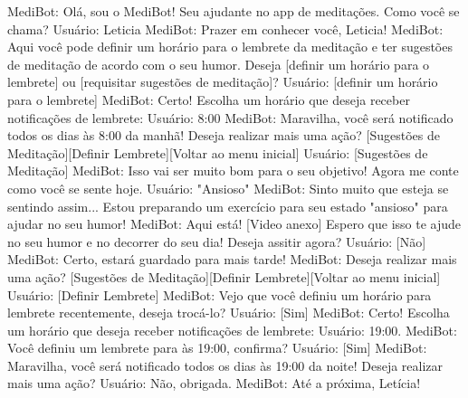 MediBot: Olá, sou o MediBot! Seu ajudante no app de meditações. Como você se chama?
Usuário: Leticia
MediBot: Prazer em conhecer você, Leticia!
MediBot: Aqui você pode definir um horário para o lembrete da meditação
        e ter sugestões de meditação de acordo com o seu humor. Deseja [definir um horário para o lembrete]
        ou [requisitar sugestões de meditação]?
Usuário: [definir um horário para o lembrete]
MediBot: Certo! Escolha um horário que deseja receber notificações de lembrete:
Usuário: 8:00
MediBot: Maravilha, você será notificado todos os dias às 8:00 da manhã! Deseja realizar mais uma ação? 
        [Sugestões de Meditação][Definir Lembrete][Voltar ao menu inicial]
Usuário: [Sugestões de Meditação]
MediBot: Isso vai ser muito bom para o seu objetivo! Agora me conte como você se sente hoje.
Usuário: "Ansioso"
MediBot: Sinto muito que esteja se sentindo assim... Estou preparando um exercício para seu estado "ansioso" para ajudar no seu humor! 
MediBot: Aqui está! [Video anexo] Espero que isso te ajude no seu humor e no decorrer do seu dia! Deseja assitir agora?
Usuário: [Não]
MediBot: Certo, estará guardado para mais tarde!
MediBot: Deseja realizar mais uma ação? 
        [Sugestões de Meditação][Definir Lembrete][Voltar ao menu inicial]
Usuário: [Definir Lembrete]
MediBot: Vejo que você definiu um horário para lembrete recentemente, deseja trocá-lo?
Usuário: [Sim]
MediBot: Certo! Escolha um horário que deseja receber notificações de lembrete:
Usuário: 19:00.
MediBot: Você definiu um lembrete para às 19:00, confirma?
Usuário: [Sim]
MediBot: Maravilha, você será notificado todos os dias às 19:00 da noite! Deseja realizar mais uma ação? 
Usuário: Não, obrigada.
MediBot: Até a próxima, Letícia!